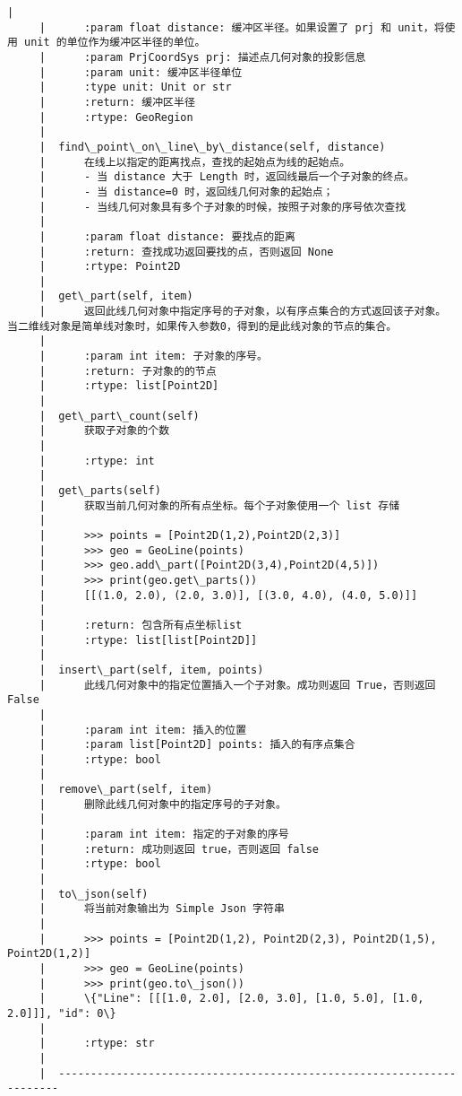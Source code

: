 \documentclass[11pt]{article}
\begin{document}
\begin{Verbatim}[commandchars=\\\{\}]
     |      
     |      :param float distance: 缓冲区半径。如果设置了 prj 和 unit，将使用 unit 的单位作为缓冲区半径的单位。
     |      :param PrjCoordSys prj: 描述点几何对象的投影信息
     |      :param unit: 缓冲区半径单位
     |      :type unit: Unit or str
     |      :return: 缓冲区半径
     |      :rtype: GeoRegion
     |  
     |  find\_point\_on\_line\_by\_distance(self, distance)
     |      在线上以指定的距离找点，查找的起始点为线的起始点。
     |      - 当 distance 大于 Length 时，返回线最后一个子对象的终点。
     |      - 当 distance=0 时，返回线几何对象的起始点；
     |      - 当线几何对象具有多个子对象的时候，按照子对象的序号依次查找
     |      
     |      :param float distance: 要找点的距离
     |      :return: 查找成功返回要找的点，否则返回 None
     |      :rtype: Point2D
     |  
     |  get\_part(self, item)
     |      返回此线几何对象中指定序号的子对象，以有序点集合的方式返回该子对象。 当二维线对象是简单线对象时，如果传入参数0，得到的是此线对象的节点的集合。
     |      
     |      :param int item: 子对象的序号。
     |      :return: 子对象的的节点
     |      :rtype: list[Point2D]
     |  
     |  get\_part\_count(self)
     |      获取子对象的个数
     |      
     |      :rtype: int
     |  
     |  get\_parts(self)
     |      获取当前几何对象的所有点坐标。每个子对象使用一个 list 存储
     |      
     |      >>> points = [Point2D(1,2),Point2D(2,3)]
     |      >>> geo = GeoLine(points)
     |      >>> geo.add\_part([Point2D(3,4),Point2D(4,5)])
     |      >>> print(geo.get\_parts())
     |      [[(1.0, 2.0), (2.0, 3.0)], [(3.0, 4.0), (4.0, 5.0)]]
     |      
     |      :return: 包含所有点坐标list
     |      :rtype: list[list[Point2D]]
     |  
     |  insert\_part(self, item, points)
     |      此线几何对象中的指定位置插入一个子对象。成功则返回 True，否则返回 False
     |      
     |      :param int item: 插入的位置
     |      :param list[Point2D] points: 插入的有序点集合
     |      :rtype: bool
     |  
     |  remove\_part(self, item)
     |      删除此线几何对象中的指定序号的子对象。
     |      
     |      :param int item: 指定的子对象的序号
     |      :return: 成功则返回 true，否则返回 false
     |      :rtype: bool
     |  
     |  to\_json(self)
     |      将当前对象输出为 Simple Json 字符串
     |      
     |      >>> points = [Point2D(1,2), Point2D(2,3), Point2D(1,5), Point2D(1,2)]
     |      >>> geo = GeoLine(points)
     |      >>> print(geo.to\_json())
     |      \{"Line": [[[1.0, 2.0], [2.0, 3.0], [1.0, 5.0], [1.0, 2.0]]], "id": 0\}
     |      
     |      :rtype: str
     |  
     |  ----------------------------------------------------------------------

\end{Verbatim}
\end{document}
